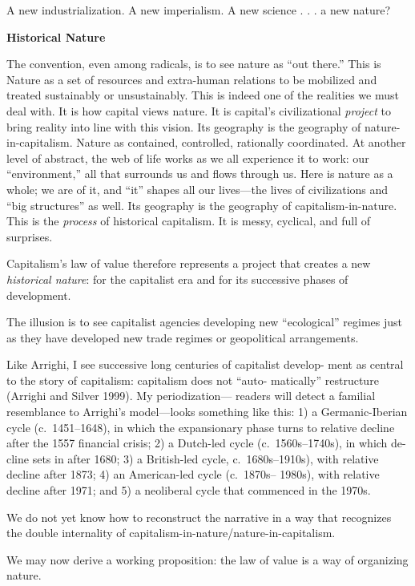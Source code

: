\documentclass[
]{book}
\begin{document}
A new industrialization. A new imperialism. A new science . . . a
new nature?

\textbf{Historical Nature}

The convention, even among radicals, is to see nature as
``out there.'' This is Nature as a set of resources and extra-human
relations to be mobilized and treated sustainably or unsustainably. This
is indeed one of the realities we must deal with. It is how capital views
nature. It is capital's civilizational \emph{project} to bring reality into line with
this vision. Its geography is the geography of nature-in-capitalism.
Nature as contained, controlled, rationally coordinated. At another
level of abstract, the web of life works as we all experience it to work:
our ``environment,'' all that surrounds us and flows through us. Here
is nature as a whole; we are of it, and ``it'' shapes all our lives---the
lives of civilizations and ``big structures'' as well. Its geography is the
geography of capitalism-in-nature. This is the \emph{process} of historical
capitalism. It is messy, cyclical, and full of surprises.

Capitalism's law of value therefore represents a project that creates
a new \emph{historical nature}: for the capitalist era and for its successive
phases of development.

The illusion is to see capitalist agencies developing new
``ecological'' regimes just as they have developed new trade regimes or
geopolitical arrangements.

Like Arrighi, I see successive long centuries of capitalist develop-
ment as central to the story of capitalism: capitalism does not ``auto-
matically'' restructure (Arrighi and Silver 1999). My periodization---
readers will detect a familial resemblance to Arrighi's model---looks
something like this: 1) a Germanic-Iberian cycle (c.~1451--1648), in
which the expansionary phase turns to relative decline after the 1557
financial crisis; 2) a Dutch-led cycle (c.~1560s--1740s), in which de-
cline sets in after 1680; 3) a British-led cycle, c.~1680s--1910s), with
relative decline after 1873; 4) an American-led cycle (c.~1870s--
1980s), with relative decline after 1971; and 5) a neoliberal cycle that
commenced in the 1970s.

We do not yet know
how to reconstruct the narrative in a way that recognizes the double
internality of capitalism-in-nature/nature-in-capitalism.

We may now derive a working proposition: the law of value is a
way of organizing nature.
\end{document}
